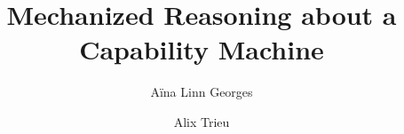 \documentclass[sigplan,review]{acmart}\settopmatter{printfolios=true,printccs=false,printacmref=false}
\begin{document}
\title[Short Title]{Mechanized Reasoning about a Capability Machine}



\author{A{\"i}na Linn Georges}

\author{Alix Trieu}
\end{document}
